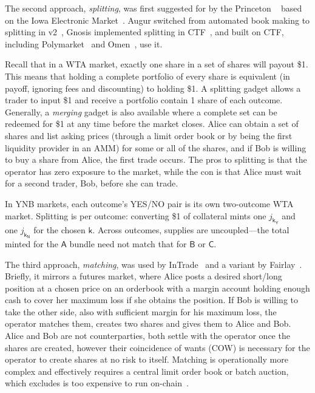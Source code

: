 The second approach, \textit{splitting}, was first suggested for \depms by the Princeton \depm~\cite{BCFKMN14} based on the Iowa Electronic Market~\cite{iem}. Augur switched from automated book making to splitting in v2~\cite{AKPWZ19}, Gnosis implemented splitting in CTF~\cite{ctf}, and \depms built on CTF, including Polymarket~\cite{poly} and Omen~\cite{Omen_docs}, use it.

Recall that in a WTA market, exactly one share in a set of shares will payout \$1. This means that holding a complete portfolio of every share is equivalent (in payoff, ignoring fees and discounting) to holding \$1. A splitting gadget allows a trader to input \$1 and receive a portfolio contain 1 share of each outcome. Generally, a \textit{merging} gadget is also available where a complete set can be redeemed for \$1 at any time before the market closes. Alice can obtain a set of shares and list asking prices (through a limit order book or by being the first liquidity provider in an AMM) for some or all of the shares, and if Bob is willing to buy a share from Alice, the first trade occurs. The pros to splitting is that the operator has zero exposure to the market, while the con is that Alice must wait for a second trader, Bob, before she can trade. 

In YNB markets, each outcome’s YES/NO pair is its own two-outcome WTA market. Splitting is per outcome: converting \$1 of collateral mints one $j_{\mathsf{k_Y}}$ and one $j_{\mathsf{k_N}}$ for the chosen $\mathsf{k}$. Across outcomes, supplies are uncoupled---the total minted for the $\mathsf{A}$ bundle need not match that for $\mathsf{B}$ or $\mathsf{C}$. 

The third approach, \textit{matching}, was used by InTrade~\cite{intrade} and a variant by Fairlay~\cite{fairlay}. Briefly, it mirrors a futures market, where Alice posts a desired short/long position at a chosen price on an orderbook with a margin account holding enough cash to cover her maximum loss if she obtains the position. If Bob is willing to take the other side, also with sufficient margin for his maximum loss, the operator matches them, creates two shares and gives them to Alice and Bob. Alice and Bob are not counterparties, both settle with the operator once the shares are created, however their coincidence of wants (COW) is necessary for the operator to create shares at no risk to itself. Matching is operationally more complex and effectively requires a central limit order book or batch auction, which excludes is too expensive to run on-chain~\cite{MoCl23}. 


